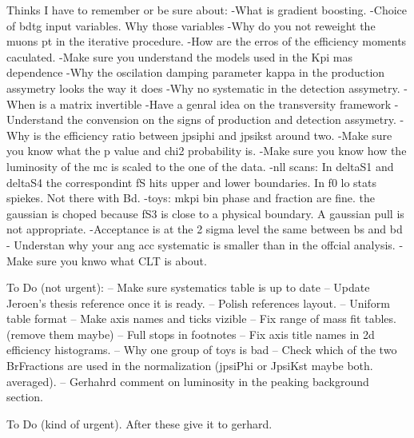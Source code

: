 
Thinks I have to remember or be sure about:
-What is gradient boosting.
-Choice of bdtg input variables. Why those variables
-Why do you not reweight the muons pt in the iterative procedure.
-How are the erros of the efficiency moments caculated.
-Make sure you understand the models used in the Kpi mas dependence
-Why the oscilation damping parameter kappa in the production assymetry looks the way it does 
-Why no systematic in the detection assymetry.
-When is a matrix invertible
-Have a genral idea on the transversity framework
-Understand the convension on the signs of production and detection assymetry.
-Why is the efficiency ratio between jpsiphi and jpsikst around two.
-Make sure you know what the p value and chi2 probability is.
-Make sure you know how the luminosity of the mc is scaled to the one of the data.
-nll scans: 
    In deltaS1 and deltaS4 the correspondint fS hits upper and lower boundaries.
    In f0 lo stats spiekes. Not there with Bd. 
-toys:
    mkpi bin phase and fraction are fine. the gaussian is choped because fS3 is close to a physical boundary. A gaussian pull is not appropriate.
-Acceptance is at the 2 sigma level the same between bs and bd
- Understan why your ang acc systematic is smaller than in the offcial analysis.
- Make sure you knwo what CLT is about.

To Do (not urgent):
-- Make sure systematics table is up to date
-- Update Jeroen's thesis reference once it is ready.
-- Polish references layout.
-- Uniform table format
-- Make axis names and ticks vizible
-- Fix range of mass fit tables.(remove them maybe)
-- Full stops in footnotes
-- Fix axis title names in 2d efficiency histograms.
-- Why one group of toys is bad
-- Check which of the two BrFractions are used in the normalization (jpsiPhi or JpsiKst maybe both. averaged).
-- Gerhahrd comment on luminosity in the peaking background section.

To Do (kind of urgent). After these give it to gerhard.


